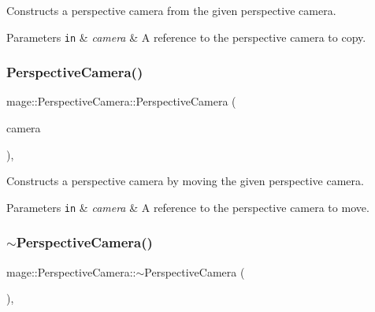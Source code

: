 Constructs a perspective camera from the given perspective camera.


\begin{DoxyParams}[1]{Parameters}
\mbox{\tt in}  & {\em camera} & A reference to the perspective camera to copy. \\
\hline
\end{DoxyParams}
\hypertarget{classmage_1_1_perspective_camera_a7ca5bbd2637f6d27a0be68635acd4788}{}\label{classmage_1_1_perspective_camera_a7ca5bbd2637f6d27a0be68635acd4788} 
\subsubsection{\texorpdfstring{Perspective\+Camera()}{PerspectiveCamera()}\hspace{0.1cm}{\footnotesize\ttfamily [6/6]}}
{\footnotesize\ttfamily mage\+::\+Perspective\+Camera\+::\+Perspective\+Camera (\begin{DoxyParamCaption}\item[{\hyperlink{classmage_1_1_perspective_camera}{Perspective\+Camera} \&\&}]{camera }\end{DoxyParamCaption})\hspace{0.3cm}{\ttfamily [default]}, {\ttfamily [noexcept]}}

Constructs a perspective camera by moving the given perspective camera.


\begin{DoxyParams}[1]{Parameters}
\mbox{\tt in}  & {\em camera} & A reference to the perspective camera to move. \\
\hline
\end{DoxyParams}
\hypertarget{classmage_1_1_perspective_camera_a47ba88d7458528795dd832474cdb3eb9}{}\label{classmage_1_1_perspective_camera_a47ba88d7458528795dd832474cdb3eb9} 
\subsubsection{\texorpdfstring{$\sim$\+Perspective\+Camera()}{~PerspectiveCamera()}}
{\footnotesize\ttfamily mage\+::\+Perspective\+Camera\+::$\sim$\+Perspective\+Camera (\begin{DoxyParamCaption}{ }\end{DoxyParamCaption})\hspace{0.3cm}{\ttfamily [virtual]}, {\ttfamily [default]}}

